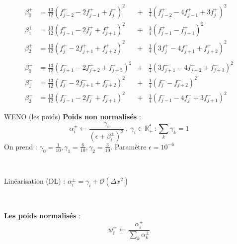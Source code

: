 \documentclass{beamer}
\begin{document}
\begin{frame}
  $$
    \begin{aligned}
      \beta_0^+ &= \frac{13}{12}\left( f^+_{j-2} - 2f^+_{j-1} + f^+_{j}   \right)^2\!\!\!\!\!\!&+& \frac{1}{4}\left(  f^+_{j-2} - 4f^+_{j-1} + 3f^+_{j}   \right)^2 \\
      \beta_1^+ &= \frac{13}{12}\left( f^+_{j-1} - 2f^+_{j}   + f^+_{j+1} \right)^2\!\!\!\!\!\!&+& \frac{1}{4}\left(  f^+_{j-1}              -  f^+_{j+1} \right)^2 \\
      \beta_2^+ &= \frac{13}{12}\left( f^+_{j}   - 2f^+_{j+1} + f^+_{j+2} \right)^2\!\!\!\!\!\!&+& \frac{1}{4}\left( 3f^+_{j}   - 4f^+_{j+1} +  f^+_{j+2} \right)^2\\
      & & & \\
      \beta_0^- &= \frac{13}{12}\left( f^-_{j+1} - 2f^-_{j+2} + f^-_{j+3} \right)^2\!\!\!\!\!\!&+& \frac{1}{4}\left( 3f^-_{j+1} - 4f^-_{j+2} +  f^-_{j+3} \right)^2 \\
      \beta_1^- &= \frac{13}{12}\left( f^-_{j}   - 2f^-_{j+1} + f^-_{j+2} \right)^2\!\!\!\!\!\!&+& \frac{1}{4}\left(  f^-_{j}                -  f^-_{j+2} \right)^2 \\
      \beta_2^- &= \frac{13}{12}\left( f^-_{j-1} - 2f^-_{j}   + f^-_{j+1} \right)^2\!\!\!\!\!\!&+& \frac{1}{4}\left(  f^-_{j-1} - 4f^-_{j}   + 3f^-_{j+1} \right)^2
    \end{aligned}
  $$
\end{frame}

\begin{frame}{WENO (les poids)}
  \textbf{Poids non normalisés} :
  $$
      \alpha_i^\pm \gets \frac{\gamma_i}{(\epsilon+\beta_i^\pm)^2}\ ,\  \gamma_i \in\mathbb{R}^*_+\,: \sum_k\gamma_k = 1
  $$
  On prend : $\gamma_0 = \frac{1}{10}, \gamma_1=\frac{6}{10}, \gamma_2=\frac{3}{10}$. Paramètre $\epsilon = 10^{-6}$

  \

  Linéarisation (DL) : $\alpha_i^\pm = \gamma_i + \mathcal{O}(\Delta x^2)$

  \ 

  \textbf{Les poids normalisés} :
  $$
      w_i^\pm \gets \frac{\alpha_i^\pm}{\sum_k\alpha_k^\pm}
  $$

\end{frame}
\end{document}
